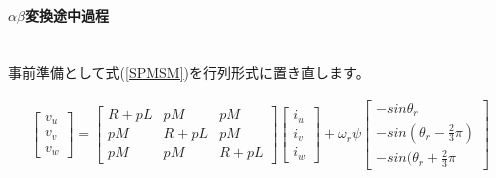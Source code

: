 \paragraph{$\alpha\beta$変換途中過程}\mbox{}\\
事前準備として式(\ref{SPMSM})を行列形式に置き直します。
\begin{fleqn}[8pt]
{\large
\begin{align}
    \begin{bmatrix}
        v_{u} \\
        v_{v} \\
    v_{w}
    \end{bmatrix}
    =
    \begin{bmatrix}
        R+pL & pM & pM \\
        pM & R+pL & pM \\
    pM & pM & R+pL
    \end{bmatrix}
    \begin{bmatrix}
        i_{u} \\
        i_{v} \\
    i_{w}
    \end{bmatrix}
    + \omega_{r}\psi
    \begin{bmatrix}
        -sin\theta_{r} \\
        -sin(\theta_{r} - \frac{2}{3}\pi) \\
    -sin(\theta_{r} + \frac{2}{3}\pi
    \end{bmatrix}
    \label{SPMSM-mat}
\end{align}
}


\end{fleqn}
